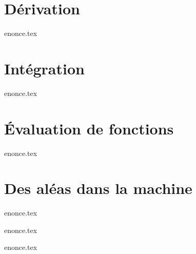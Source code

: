\documentclass[a4paper,11pt,titlepage]{article}
\begin{document}
\section{Dérivation}
{enonce.tex}
\FloatBarrier
\pagebreak

\section{Intégration}
{enonce.tex}
\pagebreak

\section{Évaluation de fonctions}
{enonce.tex}
\pagebreak

\section{Des aléas dans la machine}
{enonce.tex}
\pagebreak

{enonce.tex}
\pagebreak

{enonce.tex}
\end{document}
